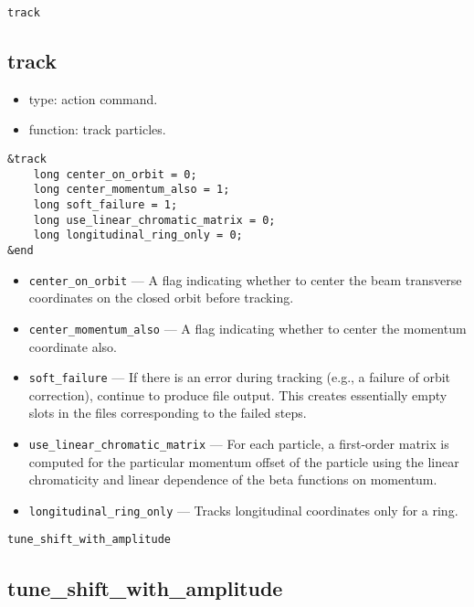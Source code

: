 \documentclass[11pt]{article}
\begin{document}
\begin{latexonly}
\newpage
\begin{center}{\Large\verb|track|}\end{center}
\end{latexonly}
\subsection{track}

\begin{itemize}
\item type: action command.
\item function: track particles.
\end{itemize}

\begin{verbatim}
&track
    long center_on_orbit = 0;
    long center_momentum_also = 1;
    long soft_failure = 1;
    long use_linear_chromatic_matrix = 0;
    long longitudinal_ring_only = 0;
&end
\end{verbatim}

\begin{itemize}
\item \verb|center_on_orbit| --- A flag indicating whether to center
the beam transverse coordinates on the closed orbit before tracking.
\item \verb|center_momentum_also| --- A flag indicating whether to
center the momentum coordinate also.
\item \verb|soft_failure| --- If there is an error during tracking (e.g.,
a failure of orbit correction), continue to produce file output.  This
creates essentially empty slots in the files corresponding to the failed
steps.
\item \verb|use_linear_chromatic_matrix| --- For each particle, a first-order
matrix is computed for the particular momentum offset 
of the particle using the linear chromaticity and linear dependence of 
the beta functions on momentum.
\item \verb|longitudinal_ring_only| --- Tracks longitudinal coordinates only
for a ring.  
\end{itemize}

\begin{latexonly}
\newpage
\begin{center}{\Large\verb|tune_shift_with_amplitude|}\end{center}
\end{latexonly}
\subsection{tune\_shift\_with\_amplitude}
\end{document}
